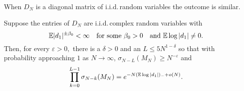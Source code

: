 \documentclass{amsart}
\numberwithin{equation}{section}
\def\corAB{}
\begin{document}
When \corAB{$D_N$ is a diagonal matrix} of i.i.d.\,random variables the outcome is similar.
\begin{corollary}
  \label{cor:iidssv}
  Suppose the entries of \corAB{$D_N$} are  i.i.d.\,complex random variables with
  \begin{equation}
    \label{eq-exceed}
    \Exp |d_1|^{\pm \corAB{\beta_0}} < \infty \quad \mbox{\rm for some \corAB{$\beta_0 >0$}}
    \quad
    \mbox{\rm
    and $\Exp \log |d_1| \neq 0$}.
  \end{equation}
  Then, for every $\varepsilon > 0,$ there is a $\delta > 0$
and an \corAB{$L \leq 5 N^{1-\delta}$} so that with probability approaching
$1$ as $N\to\infty$,
  \(
  \sigma_{N-\corAB{L}}(M_N) \geq N^{-\varepsilon}
  \)
  and
  \[
  \prod_{k=0}^{\corAB{L}-1} \sigma_{N-k}(M_N) = e^{-N(\Exp\log|d_1|)_{-} + o(N)}.
  \]
\end{corollary}
\end{document}
